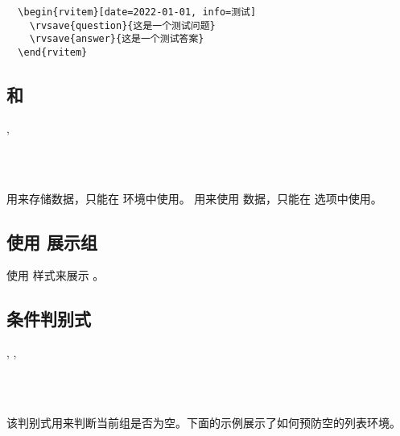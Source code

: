\documentclass[full]{l3doc}
\begin{document}
\begin{documentation}
\begin{verbatim}
  \begin{rvitem}[date=2022-01-01, info=测试]
    \rvsave{question}{这是一个测试问题}
    \rvsave{answer}{这是一个测试答案}
  \end{rvitem}
\end{verbatim}

\subsection{ 和 }

\begin{function}{\rvsave, \rvuse}
  \begin{syntax}
       \\
       \\
  \end{syntax}

   用来存储数据，只能在  环境中使用。 用来使用
  数据，只能在  选项中使用。
\end{function}

\subsection{使用  展示组}

\begin{function}{\rvshow}
  \begin{syntax}
      
  \end{syntax}

  使用  样式来展示 。
\end{function}

\subsection{条件判别式}

\begin{function}{\rvIfEmptyT, \rvIfEmptyF, \rvIfEmptyTF}
  \begin{syntax}
       \\
      \\
     
  \end{syntax}

  该判别式用来判断当前组是否为空。下面的示例展示了如何预防空的列表环境。
\end{function}


\end{documentation}
\end{document}
